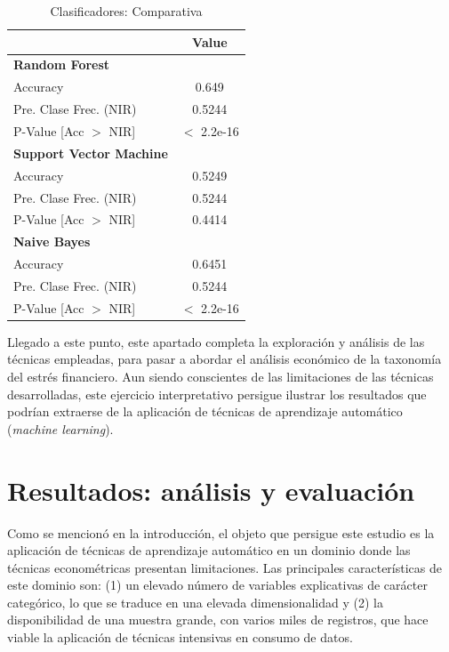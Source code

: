 \documentclass[a4paper, 11pt]{article}
\begin{document}
\begin{table}[ht]
\centering
\begin{tabular}{lc}
\toprule
\textbf{} & \textbf{Value} \\
\midrule
\textbf{Random Forest} & \\
\hspace{1em} Accuracy & 0.649 \\
\hspace{1em} Pre. Clase Frec. (NIR) &  0.5244\\
\hspace{1em} P-Value [Acc $>$ NIR] &  $<$ 2.2e-16\\
\textbf{Support Vector Machine} & \\
\hspace{1em} Accuracy &  0.5249 \\
\hspace{1em} Pre. Clase Frec. (NIR) & 0.5244\\
\hspace{1em} P-Value [Acc $>$ NIR] &  0.4414\\
\textbf{Naive Bayes} & \\
\hspace{1em} Accuracy &  0.6451 \\
\hspace{1em} Pre. Clase Frec. (NIR) &  0.5244\\
\hspace{1em} P-Value [Acc $>$ NIR] &  $<$ 2.2e-16\\
\bottomrule
\end{tabular}
\caption{Clasificadores: Comparativa}
\label{tab:clasifiers_comparative}
\end{table}

Llegado a este punto, este apartado completa la exploración y análisis de las técnicas empleadas, 
para pasar a abordar el análisis económico de la taxonomía del estrés financiero. Aun siendo 
conscientes de las limitaciones de las técnicas desarrolladas, este ejercicio interpretativo
persigue ilustrar los resultados que podrían extraerse de la aplicación de técnicas de aprendizaje
automático (\textit{machine learning}). 

\section{Resultados: análisis y evaluación}
\label{sec:results_analysis}
Como se mencionó en la introducción, el objeto que persigue este estudio es la aplicación
de técnicas de aprendizaje automático en un dominio donde las técnicas econométricas 
presentan limitaciones. Las principales características de este dominio son: (1) un elevado
número de variables explicativas de carácter categórico, lo que se traduce en una elevada 
dimensionalidad y (2) la disponibilidad de una muestra grande, con varios miles de registros, 
que hace viable la aplicación de técnicas intensivas en consumo de datos.
\end{document}
